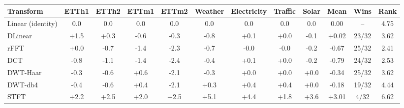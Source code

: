 \begin{tabular}{lccccccccccc}
\toprule
\textbf{Transform} & \textbf{ETTh1} & \textbf{ETTh2} & \textbf{ETTm1} & \textbf{ETTm2} & \textbf{Weather} & \textbf{Electricity} & \textbf{Traffic} & \textbf{Solar} & \textbf{Mean} & \textbf{Wins} & \textbf{Rank} \\
\midrule
Linear (identity) & 0.0 & 0.0 & 0.0 & 0.0 & 0.0 & 0.0 & 0.0 & 0.0 & 0.00 & -- & 4.75 \\
DLinear & +1.5 & +0.3 & -0.6 & -0.3 & -0.8 & +0.1 & +0.0 & -0.1 & +0.02 & 23/32 & 3.62 \\
rFFT & +0.0 & -0.7 & -1.4 & -2.3 & -0.7 & -0.0 & -0.0 & -0.2 & -0.67 & 25/32 & 2.41 \\
DCT & -0.8 & -1.1 & -1.4 & -2.4 & -0.4 & +0.1 & +0.0 & -0.2 & -0.79 & 24/32 & 2.53 \\
DWT-Haar & -0.3 & -0.6 & +0.6 & -2.1 & -0.3 & +0.0 & +0.0 & +0.0 & -0.34 & 25/32 & 3.62 \\
DWT-db4 & -0.4 & -0.6 & +0.4 & -2.1 & +0.3 & +0.4 & +0.4 & +0.0 & -0.18 & 19/32 & 4.44 \\
STFT & +2.2 & +2.5 & +2.0 & +2.5 & +5.1 & +4.4 & +1.8 & +3.6 & +3.01 & 4/32 & 6.62 \\
\bottomrule
\end{tabular}
